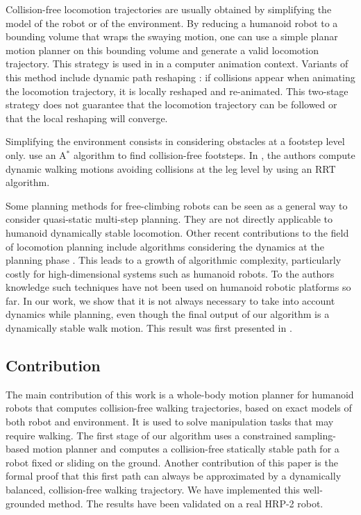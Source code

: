 \documentclass{article}
\begin{document}
Collision-free  locomotion   trajectories  are  usually   obtained  by
simplifying the model of the  robot or of the environment. By reducing 
a  humanoid robot to a bounding volume that wraps the swaying motion,
one can  use a simple  planar motion planner  on this bounding  volume and
generate  a valid  locomotion  trajectory. This  strategy  is used  in
\cite{pettre20032} in a computer animation context. Variants of this method
include  dynamic path reshaping  \cite{yoshida-humanoids05}: if  collisions appear
when animating  the locomotion  trajectory, it is  locally reshaped
and re-animated.  This two-stage  strategy does not guarantee that the
locomotion trajectory can be followed or that the local reshaping will
converge.

Simplifying  the environment  consists in  considering obstacles  at a
footstep   level only.   \cite{kuffner2001footstep,chestnutt2005footstep,kuffner2005motion}
use   an  A$^{*}$   algorithm  to   find
collision-free   footsteps.    In   \cite{perrin2012fast},   the   authors   compute
dynamic walking motions avoiding collisions at the leg level
by using  an RRT algorithm. 

Some planning methods for free-climbing robots \cite{bretl2006motion}
can be seen as a general way 
to consider quasi-static multi-step planning. They are not directly applicable to
humanoid dynamically stable locomotion.
Other recent contributions to the field of locomotion planning  include algorithms 
considering the dynamics at the planning phase \cite{shkolnik2011bounding}. This leads to 
a growth of algorithmic complexity, particularly costly for high-dimensional
systems such as humanoid robots. To the authors knowledge such techniques have not been
used on humanoid robotic platforms so far.
In our work, we show that it is not always
necessary to take into account dynamics while planning, even though the final
output of our algorithm is a dynamically stable walk motion. This result was first
presented in \cite{dalibard2011small}.



\subsection{Contribution}

The main contribution of this work is a  whole-body motion planner for humanoid robots
that computes collision-free walking trajectories, based on
exact models of both robot and environment. It is used to solve manipulation tasks
that may require walking. The first stage of our algorithm uses a
constrained sampling-based motion 
planner and  computes a collision-free  statically stable path  for a robot fixed or sliding 
on the ground. Another  contribution of this  paper is the formal  proof that
this first path can always be  approximated by a dynamically balanced, collision-free
walking  trajectory. We have implemented this well-grounded 
method.  The results have been validated on a real HRP-2 robot.
\end{document}
